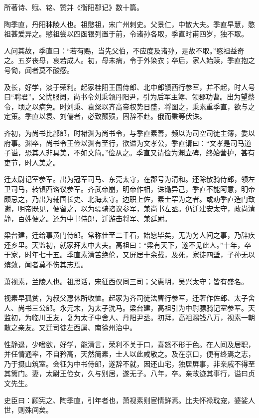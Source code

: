 \documentclass[12pt,UTF8]{ctexbook}
\begin{document}
所著诗、赋、铭、赞并《衡阳郡记》数十篇。

陶季直，丹阳秣陵人也。祖愍祖，宋广州刺史。父景仁，中散大夫。季直早慧，愍祖甚爱异之。愍祖尝以四函银列置于前，令诸孙各取，季直时甫四岁，独不取。

人问其故，季直曰：“若有赐，当先父伯，不应度及诸孙，是故不取。”愍祖益奇之。五岁丧母，哀若成人。初，母未病，令于外染衣；卒后，家人始赎，季直抱之号恸，闻者莫不酸感。

及长，好学，淡于荣利。起家桂阳王国侍郎、北中郎镇西行参军，并不起，时人号曰“聘君”。父忧服阕，尚书令刘秉领丹阳尹，引为后军主簿、领郡功曹。出为望蔡令，顷之以病免。时刘秉、袁粲以齐高帝权势日盛，将图之，秉素重季直，欲与之定策。季直以袁、刘儒者，必致颠殒，固辞不赴。俄而秉等伏诛。

齐初，为尚书比部郎，时褚渊为尚书令，与季直素善，频以为司空司徒主簿，委以府事。渊卒，尚书令王俭以渊有至行，欲谥为文孝公，季直请曰：“文孝是司马道子谥，恐其人非具美，不如文简。”俭从之。季直又请俭为渊立碑，终始营护，甚有吏节，时人美之。

迁太尉记室参军。出为冠军司马、东莞太守，在郡号为清和。还除散骑侍郎，领左卫司马，转镇西谘议参军。齐武帝崩，明帝作相，诛锄异己，季直不能阿意，明帝颇忌之，乃出为辅国长史、北海太守。边职上佐，素士罕为之者。或劝季直造门致谢，明帝既见，便留之，以为骠骑谘议参军，兼尚书左丞。仍迁建安太守，政尚清静，百姓便之。还为中书侍郎，迁游击将军、兼廷尉。

梁台建，迁给事黄门侍郎。常称仕至二千石，始愿毕矣，无为务人间之事，乃辞疾还乡里。天监初，就家拜太中大夫。高祖曰：“梁有天下，遂不见此人。”十年，卒于家，时年七十五。季直素清苦绝伦，又屏居十余载，及死，家徒四壁，子孙无以殡敛，闻者莫不伤其志焉。

萧视素，兰陵人也。祖思话，宋征西仪同三司；父惠明，吴兴太守；皆有盛名。

视素早孤贫，为叔父惠休所收恤。起家为齐司徒法曹行参军，迁著作佐郎、太子舍人、尚书三公郎。永元末，为太子洗马。梁台建，高祖引为中尉骠骑记室参军。天监初，为临川王友，复为太子中舍人、丹阳尹丞。初拜，高祖赐钱八万，视素一朝散之亲友。又迁司徒左西属、南徐州治中。

性静退，少嗜欲，好学，能清言，荣利不关于口，喜怒不形于色。在人间及居职，并任情通率，不自矜高，天然简素，士人以此咸敬之。及在京口，便有终焉之志，乃于摄山筑室。会征为中书侍郎，遂辞不就，因还山宅，独居屏事，非亲戚不得至其篱门。妻，太尉王俭女，久与别居，遂无子。八年，卒。亲故迹其事行，谥曰贞文先生。

史臣曰：顾宪之、陶季直，引年者也，萧视素则宦情鲜焉。比夫怀禄耽宠，婆娑人世，则殊间矣。
\end{document}
